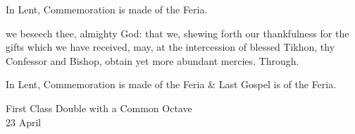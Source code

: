 \begin{rubric}
    In Lent, Commemoration is made of the Feria.%
\end{rubric}

\postcommunion
{} we beseech thee, almighty God: that we, shewing forth our thankfulness for the gifts which we have received, may, at the intercession of blessed Tikhon, thy Confessor and Bishop, obtain yet more abundant mercies. Through.

\begin{rubric}
    In Lent, Commemoration is made of the Feria \& Last Gospel is of the Feria.
\end{rubric}


\begin{inhead}
    {First Class Double with a Common Octave\\
23 April}
\end{inhead}

\properantiphonfix

